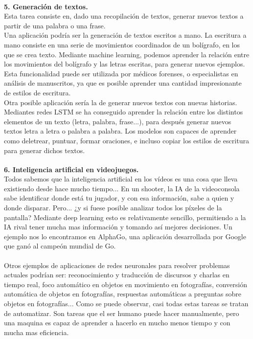 \\\textbf{5. Generación de textos.}\\
Esta tarea consiste en, dado una recopilación de textos, generar nuevos textos a partir de una palabra o una frase.\\
Una aplicación podría ser la generación de textos escritos a mano. La escritura a mano consiste en una serie de movimientos coordinados de un bolígrafo, en los que se crea texto. Mediante machine learning, podemos aprender la relación entre los movimientos del bolígrafo y las letras escritas, para generar nuevos ejemplos. Esta funcionalidad puede ser utilizada por médicos forenses, o especialistas en análisis de manuscritos, ya que es posible aprender una cantidad impresionante de estilos de escritura.\\
Otra posible aplicación sería la de generar nuevos textos con nuevas historias. Mediantes redes LSTM se ha conseguido aprender la relación entre los distintos elementos de un texto (letra, palabra, frase...), para después generar nuevos textos letra a letra o palabra a palabra. Los modelos son capaces de aprender como deletrear, puntuar, formar oraciones, e incluso copiar los estilos de escritura para generar dichos textos.\\
\\\textbf{6. Inteligencia artificial en videojuegos.}\\
Todos sabemos que la inteligencia artificial en los vídeos es una cosa que lleva existiendo desde hace mucho tiempo... En un shooter, la IA de la videoconsola sabe identificar donde está tu jugador, y con esa información, sabe a quien y donde disparar. Pero... ¿y si fuese posible analizar todos los píxeles de la pantalla? Mediante deep learning esto es relativamente sencillo, permitiendo a la IA rival tener mucha mas información y tomando así mejores decisiones. Un ejemplo nos lo encontramos en AlphaGo, una aplicación desarrollada por Google que ganó al campeón mundial de Go.\\\\
Otros ejemplos de aplicaciones de redes neuronales para resolver problemas actuales podrían ser: reconocimiento y traducción de discursos y charlas en tiempo real, foco automático en objetos en movimiento en fotografías, conversión automática de objetos en fotografías, respuestas automáticas a preguntas sobre objetos en fotografías... Como se puede observar, casi todas estas tareas se tratan de automatizar. Son tareas que el ser humano puede hacer manualmente, pero una maquina es capaz de aprender a hacerlo en mucho menos tiempo y con mucha mas eficiencia.




